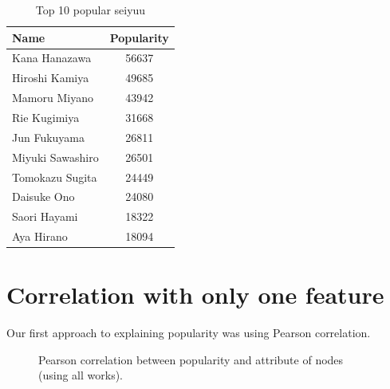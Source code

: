 \begin{table}[!h]
	\begin{center}
	\caption{Top 10 popular seiyuu}
	\label{tab:top10Popularity}
	\begin{tabular}{|l|c|}
		\hline
		Name & Popularity \\ 
		\hline
		Kana Hanazawa & 56637 \\ 
		\hline
		Hiroshi Kamiya & 49685 \\ 
		\hline
		Mamoru Miyano & 43942 \\ 
		\hline
		Rie Kugimiya & 31668 \\ 
		\hline
		Jun Fukuyama & 26811 \\ 
		\hline
		Miyuki Sawashiro & 26501 \\ 
		\hline
		Tomokazu Sugita & 24449 \\ 
		\hline
		Daisuke Ono & 24080 \\ 
		\hline
		Saori Hayami & 18322 \\ 
		\hline
		Aya Hirano & 18094 \\ 
		\hline
	\end{tabular}
	\end{center}
\end{table}

\newpage
\section{Correlation with only one feature}
Our first approach to explaining popularity was using Pearson correlation.

\begin{figure}[!h]
	\begin{flushleft}
	\caption{Pearson correlation between popularity and attribute of nodes (using all works).}
	\label{fig:pearsonCorrAllWorks}
	\end{flushleft}
\end{figure}

